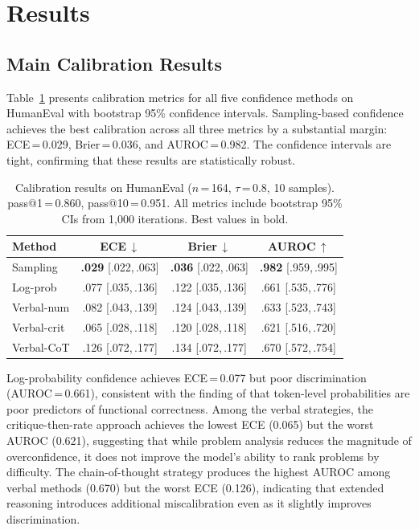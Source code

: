 \documentclass{article}
\begin{document}
\section{Results}
\label{sec:results}

\subsection{Main Calibration Results}
\label{sec:main_results}

Table~\ref{tab:humaneval} presents calibration metrics for all five confidence methods on HumanEval with bootstrap 95\% confidence intervals. Sampling-based confidence achieves the best calibration across all three metrics by a substantial margin: ECE\,=\,0.029, Brier\,=\,0.036, and AUROC\,=\,0.982. The confidence intervals are tight, confirming that these results are statistically robust.

\begin{table}[t]
\centering
\caption{Calibration results on HumanEval ($n$\,=\,164, $\tau$\,=\,0.8, 10 samples). pass@1\,=\,0.860, pass@10\,=\,0.951. All metrics include bootstrap 95\% CIs from 1,000 iterations. Best values in bold.}
\label{tab:humaneval}
\small
\setlength{\tabcolsep}{3pt}
\begin{tabular}{@{}lccc@{}}
\toprule
\textbf{Method} & \textbf{ECE\,$\downarrow$} & \textbf{Brier\,$\downarrow$} & \textbf{AUROC\,$\uparrow$} \\
\midrule
Sampling & \textbf{.029} {\scriptsize[.022,\,.063]} & \textbf{.036} {\scriptsize[.022,\,.063]} & \textbf{.982} {\scriptsize[.959,\,.995]} \\
Log-prob & .077 {\scriptsize[.035,\,.136]} & .122 {\scriptsize[.035,\,.136]} & .661 {\scriptsize[.535,\,.776]} \\
Verbal-num & .082 {\scriptsize[.043,\,.139]} & .124 {\scriptsize[.043,\,.139]} & .633 {\scriptsize[.523,\,.743]} \\
Verbal-crit & .065 {\scriptsize[.028,\,.118]} & .120 {\scriptsize[.028,\,.118]} & .621 {\scriptsize[.516,\,.720]} \\
Verbal-CoT & .126 {\scriptsize[.072,\,.177]} & .134 {\scriptsize[.072,\,.177]} & .670 {\scriptsize[.572,\,.754]} \\
\bottomrule
\end{tabular}
\vspace{-0.5em}
\end{table}

Log-probability confidence achieves ECE\,=\,0.077 but poor discrimination (AUROC\,=\,0.661), consistent with the finding of \citet{spiess2025calibration} that token-level probabilities are poor predictors of functional correctness. Among the verbal strategies, the critique-then-rate approach achieves the lowest ECE (0.065) but the worst AUROC (0.621), suggesting that while problem analysis reduces the magnitude of overconfidence, it does not improve the model's ability to rank problems by difficulty. The chain-of-thought strategy produces the highest AUROC among verbal methods (0.670) but the worst ECE (0.126), indicating that extended reasoning introduces additional miscalibration even as it slightly improves discrimination.
\end{document}
